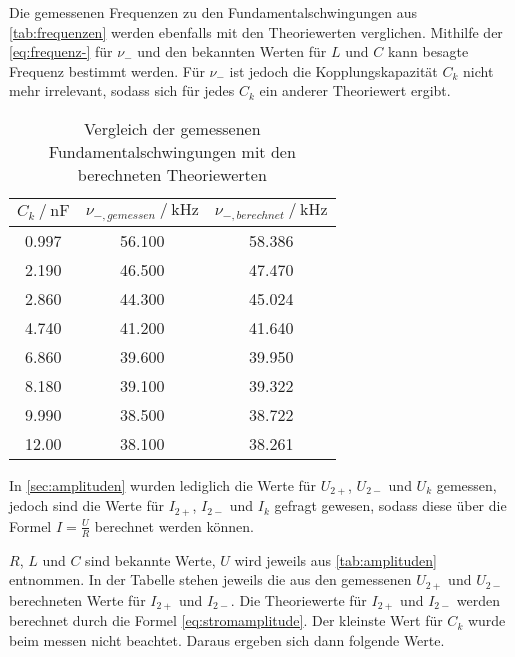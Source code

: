 Die gemessenen Frequenzen zu den Fundamentalschwingungen aus \autoref{tab:frequenzen} werden ebenfalls mit den Theoriewerten verglichen. Mithilfe der \autoref{eq:frequenz-} für $\nu _-$ und den bekannten Werten für $L$ und $C$ kann besagte Frequenz bestimmt werden. Für $\nu_-$ ist jedoch die Kopplungskapazität $C_k$ nicht mehr irrelevant, sodass sich für jedes $C_k$ ein anderer Theoriewert ergibt.

\begin{table}
  \centering
  \caption{Vergleich der gemessenen Fundamentalschwingungen mit den berechneten Theoriewerten}
  \label{tab:frequenzentheorie}
  \begin{tabular}{c c c}
    \toprule 
    $C_k \:/\: \si{\nano\farad}$ & $\nu _{-,gemessen} \:/\: \si{\kilo\hertz}$ & $\nu _{-,berechnet} \:/\: \si{\kilo\hertz}$    \\ 
    \midrule 
    0.997 & 56.100 & 58.386 \\
    2.190 & 46.500 & 47.470 \\
    2.860 & 44.300 & 45.024 \\
    4.740 & 41.200 & 41.640 \\
    6.860 & 39.600 & 39.950 \\
    8.180 & 39.100 & 39.322 \\
    9.990 & 38.500 & 38.722 \\
    12.00 & 38.100 & 38.261 \\
    \bottomrule
  \end{tabular}
\end{table}

In \autoref{sec:amplituden} wurden lediglich die Werte für $U_{2+}$, $U_{2-}$ und $U_k$ gemessen, jedoch sind die Werte für $I_{2+}$, $I_{2-}$ und $I_k$ gefragt gewesen, sodass diese über die Formel $I = \frac{U}{R}$ berechnet werden können. 

$R$, $L$ und $C$ sind bekannte Werte, $U$ wird jeweils aus \autoref{tab:amplituden} entnommen. In der Tabelle stehen jeweils die aus den gemessenen $U_{2+}$ und $U_{2-}$ berechneten Werte für $I_{2+}$ und $I_{2-}$. Die Theoriewerte für $I_{2+}$ und $I_{2-}$ werden berechnet durch die Formel \autoref{eq:stromamplitude}. Der kleinste Wert für $C_k$ wurde beim messen nicht beachtet. Daraus ergeben sich dann folgende Werte.

